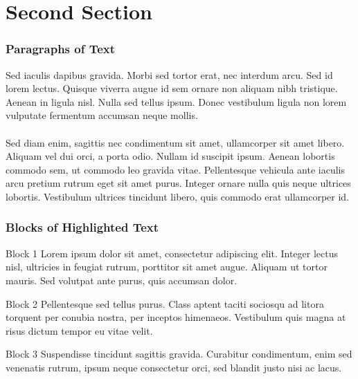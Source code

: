 \documentclass[12pt]{beamer}\usepackage[]{graphicx}\usepackage[]{color}
\begin{document}
\section{Second Section}
\begin{frame}
\frametitle{Paragraphs of Text}
Sed iaculis dapibus gravida. Morbi sed tortor erat, nec interdum arcu. Sed id lorem lectus. Quisque viverra augue id sem ornare non aliquam nibh tristique. Aenean in ligula nisl. Nulla sed tellus ipsum. Donec vestibulum ligula non lorem vulputate fermentum accumsan neque mollis.\\~\\

Sed diam enim, sagittis nec condimentum sit amet, ullamcorper sit amet libero. Aliquam vel dui orci, a porta odio. Nullam id suscipit ipsum. Aenean lobortis commodo sem, ut commodo leo gravida vitae. Pellentesque vehicula ante iaculis arcu pretium rutrum eget sit amet purus. Integer ornare nulla quis neque ultrices lobortis. Vestibulum ultrices tincidunt libero, quis commodo erat ullamcorper id.
\end{frame}

\begin{frame}
\frametitle{Blocks of Highlighted Text}
\begin{block}{Block 1}
Lorem ipsum dolor sit amet, consectetur adipiscing elit. Integer lectus nisl, ultricies in feugiat rutrum, porttitor sit amet augue. Aliquam ut tortor mauris. Sed volutpat ante purus, quis accumsan dolor.
\end{block}

\begin{block}{Block 2}
Pellentesque sed tellus purus. Class aptent taciti sociosqu ad litora torquent per conubia nostra, per inceptos himenaeos. Vestibulum quis magna at risus dictum tempor eu vitae velit.
\end{block}

\begin{block}{Block 3}
Suspendisse tincidunt sagittis gravida. Curabitur condimentum, enim sed venenatis rutrum, ipsum neque consectetur orci, sed blandit justo nisi ac lacus.
\end{block}
\end{frame}
\end{document}
